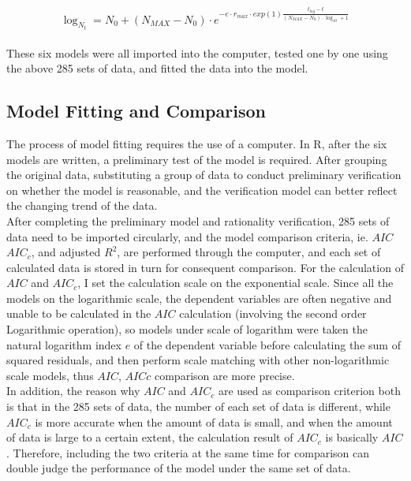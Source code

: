 \documentclass[11pt]{article}
\begin{document}
\begin{equation}
    \log_{N_t}=N_{0}+(N_{MAX}-N_{0})\cdot e^{-e\cdot r_{max}\cdot exp(1)\frac{t_{lag}-{t}}{(N_{MAX}-N_{0})\cdot \log_{10}+1}}
\end{equation}
\\
These six models were all imported into the computer, tested one by one using the above 285 sets of data, and fitted the data into the model.

\subsection{Model Fitting and Comparison}
The process of model fitting requires the use of a computer. In R, after the six models are written, a preliminary test of the model is required. After grouping the original data, substituting a group of data to conduct preliminary verification on whether the model is reasonable, and the verification model can better reflect the changing trend of the data.\\

After completing the preliminary model and rationality verification, 285 sets of data need to be imported circularly, and the model comparison criteria, ie. $AIC$ $AIC_c$, and adjusted $R^2$, are performed through the computer, and each set of calculated data is stored in turn for consequent comparison. For the calculation of $AIC$ and $AIC_c$, I set the calculation scale on the exponential scale. Since all the models on the logarithmic scale, the dependent variables are often negative and unable to be calculated in the $AIC$ calculation (involving the second order Logarithmic operation), so models under scale of logarithm were taken the natural logarithm index $e$ of the dependent variable before calculating the sum of squared residuals, and then perform scale matching with other non-logarithmic scale models, thus $AIC$, $AICc$ comparison are more precise.\\

In addition, the reason why $AIC$ and $AIC_c$ are used as comparison criterion both is that in the 285 sets of data, the number of each set of data is different, while $AIC_c$ is more accurate when the amount of data is small, and when the amount of data is large to a certain extent, the calculation result of $AIC_c$ is basically $AIC$ \citep{brewer2016relative}. Therefore, including the two criteria at the same time for comparison can double judge the performance of the model under the same set of data.\\
\end{document}
